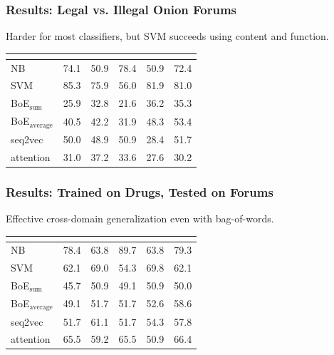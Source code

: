 \documentclass[t,xcolor={svgnames,table}]{beamer}
\begin{document}
\begin{frame}
	\frametitle{Results: Legal vs. Illegal Onion Forums}
	
	Harder for most classifiers, but SVM succeeds using content and function.
	
	\begin{center}
		\setlength{\tabcolsep}{8pt}
		\begin{tabular}{l *{5}{R}}
		& 
		& 
		& 
		& 
		& \\
		\hline
		NB & 74.1 & 50.9 & 78.4 & 50.9 & 72.4\\
		SVM & 85.3 & 75.9 & 56.0 & 81.9 & 81.0\\
		BoE$_\mathrm{sum}$ & 25.9 & 32.8 & 21.6 & 36.2 & 35.3\\
		BoE$_\mathrm{average}$ & 40.5 & 42.2 & 31.9 & 48.3 & 53.4\\
		seq2vec & 50.0 & 48.9 & 50.9 & 28.4 & 51.7\\
		attention & 31.0 & 37.2 & 33.6 & 27.6 & 30.2
		\end{tabular}
	\end{center}
\end{frame}

\begin{frame}
	\frametitle{Results: Trained on Drugs, Tested on Forums}
	
	Effective cross-domain generalization even with bag-of-words.
	
	\begin{center}
		\setlength{\tabcolsep}{8pt}
		\begin{tabular}{l *{5}{R}}
		& 
		& 
		& 
		& 
		& \\
		\hline
		NB & 78.4 & 63.8 & 89.7 & 63.8 & 79.3\\
		SVM & 62.1 & 69.0 & 54.3 & 69.8 & 62.1\\
		BoE$_\mathrm{sum}$ & 45.7 & 50.9 & 49.1 & 50.9 & 50.0\\
		BoE$_\mathrm{average}$ & 49.1 & 51.7 & 51.7 & 52.6 & 58.6\\
		seq2vec & 51.7 & 61.1 & 51.7 & 54.3 & 57.8\\
		attention & 65.5 & 59.2 & 65.5 & 50.9 & 66.4
		\end{tabular}
	\end{center}
\end{frame}
\end{document}
